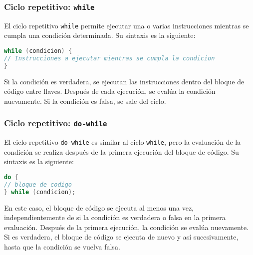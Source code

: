 \documentclass{article}
\begin{document}
\subsubsection{Ciclo repetitivo: \texttt{while}}

El ciclo repetitivo \texttt{while} permite ejecutar una o varias instrucciones mientras se cumpla una condición determinada. Su sintaxis es la siguiente:

\begin{lstlisting}[language=Java]
while (condicion) {
// Instrucciones a ejecutar mientras se cumpla la condicion
}
\end{lstlisting}

Si la condición es verdadera, se ejecutan las instrucciones dentro del bloque de código entre llaves. Después de cada ejecución, se evalúa la condición nuevamente. Si la condición es falsa, se sale del ciclo.

\subsubsection{Ciclo repetitivo: \texttt{do-while}}

El ciclo repetitivo \texttt{do-while} es similar al ciclo \texttt{while}, pero la evaluación de la condición se realiza después de la primera ejecución del bloque de código. Su sintaxis es la siguiente:

\begin{lstlisting}[language=Java]
do {
// bloque de codigo
} while (condicion);
\end{lstlisting}
    
    En este caso, el bloque de código se ejecuta al menos una vez, independientemente de si la condición es verdadera o falsa en la primera evaluación. Después de la primera ejecución, la condición se evalúa nuevamente. Si es verdadera, el bloque de código se ejecuta de nuevo y así sucesivamente, hasta que la condición se vuelva falsa.
\end{document}
